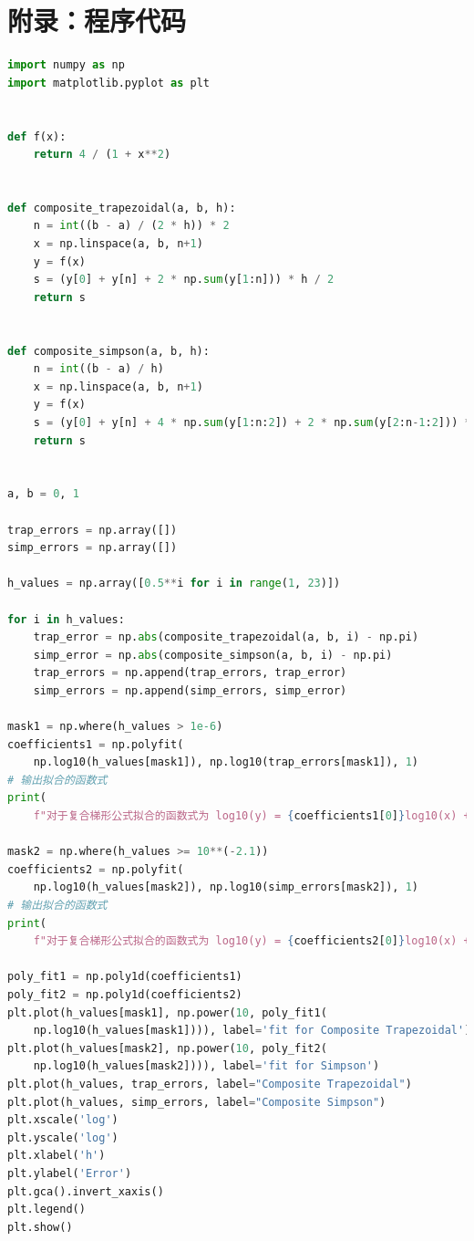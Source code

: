 \documentclass[a4paper,11pt,notitlepage]{article}
\begin{document}
\section{附录：程序代码}
\begin{lstlisting}[language=Python,caption={Fifth Chapter 1A.py},label={code1.1}]
import numpy as np
import matplotlib.pyplot as plt


def f(x):
    return 4 / (1 + x**2)


def composite_trapezoidal(a, b, h):
    n = int((b - a) / (2 * h)) * 2
    x = np.linspace(a, b, n+1)
    y = f(x)
    s = (y[0] + y[n] + 2 * np.sum(y[1:n])) * h / 2
    return s


def composite_simpson(a, b, h):
    n = int((b - a) / h)
    x = np.linspace(a, b, n+1)
    y = f(x)
    s = (y[0] + y[n] + 4 * np.sum(y[1:n:2]) + 2 * np.sum(y[2:n-1:2])) * h / 3
    return s


a, b = 0, 1

trap_errors = np.array([])
simp_errors = np.array([])

h_values = np.array([0.5**i for i in range(1, 23)])

for i in h_values:
    trap_error = np.abs(composite_trapezoidal(a, b, i) - np.pi)
    simp_error = np.abs(composite_simpson(a, b, i) - np.pi)
    trap_errors = np.append(trap_errors, trap_error)
    simp_errors = np.append(simp_errors, simp_error)

mask1 = np.where(h_values > 1e-6)
coefficients1 = np.polyfit(
    np.log10(h_values[mask1]), np.log10(trap_errors[mask1]), 1)
# 输出拟合的函数式
print(
    f"对于复合梯形公式拟合的函数式为 log10(y) = {coefficients1[0]}log10(x) + {coefficients1[1]}")

mask2 = np.where(h_values >= 10**(-2.1))
coefficients2 = np.polyfit(
    np.log10(h_values[mask2]), np.log10(simp_errors[mask2]), 1)
# 输出拟合的函数式
print(
    f"对于复合梯形公式拟合的函数式为 log10(y) = {coefficients2[0]}log10(x) + {coefficients2[1]}")

poly_fit1 = np.poly1d(coefficients1)
poly_fit2 = np.poly1d(coefficients2)
plt.plot(h_values[mask1], np.power(10, poly_fit1(
    np.log10(h_values[mask1]))), label='fit for Composite Trapezoidal')
plt.plot(h_values[mask2], np.power(10, poly_fit2(
    np.log10(h_values[mask2]))), label='fit for Simpson')
plt.plot(h_values, trap_errors, label="Composite Trapezoidal")
plt.plot(h_values, simp_errors, label="Composite Simpson")
plt.xscale('log')
plt.yscale('log')
plt.xlabel('h')
plt.ylabel('Error')
plt.gca().invert_xaxis()
plt.legend()
plt.show()    
\end{lstlisting}
\end{document}
